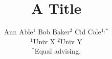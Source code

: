 \documentclass{article}

\title{A Title}
\author{\begin{minipage}[t]{\textwidth}
\centering Ann Able$^{1}$ \quad Bob Baker$^{2}$ \quad Cid Cole$^{1,*}$\\[0.6em]
\normalfont\small$^{1}$Univ X \quad$^{2}$Univ Y\\[0.3em]
$^{*}$Equal advising.
\end{minipage}}
\maketitle
Body.

